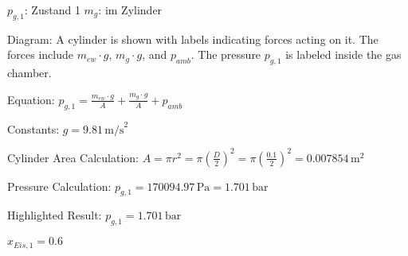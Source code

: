 \( p_{g,1} \): Zustand 1  
\( m_g \): im Zylinder  

Diagram:  
A cylinder is shown with labels indicating forces acting on it. The forces include \( m_{ew} \cdot g \), \( m_g \cdot g \), and \( p_{amb} \). The pressure \( p_{g,1} \) is labeled inside the gas chamber.  

Equation:  
\( p_{g,1} = \frac{m_{ew} \cdot g}{A} + \frac{m_g \cdot g}{A} + p_{amb} \)  

Constants:  
\( g = 9.81 \, \text{m/s}^2 \)  

Cylinder Area Calculation:  
\( A = \pi r^2 = \pi \left( \frac{D}{2} \right)^2 = \pi \left( \frac{0.1}{2} \right)^2 = 0.007854 \, \text{m}^2 \)  

Pressure Calculation:  
\( p_{g,1} = 170094.97 \, \text{Pa} = 1.701 \, \text{bar} \)  

Highlighted Result:  
\( p_{g,1} = 1.701 \, \text{bar} \)

\( x_{Eis,1} = 0.6 \)